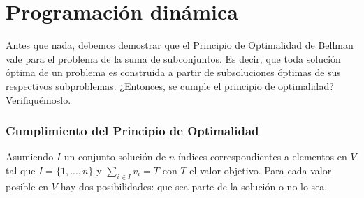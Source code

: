 \section{Programación dinámica}
Antes que nada, debemos demostrar que el Principio de Optimalidad de Bellman vale para el problema de la suma de subconjuntos. Es decir, que toda solución óptima de un problema es construida a partir de subsoluciones óptimas de sus respectivos subproblemas. ¿Entonces, se cumple el principio de optimalidad? Verifiquémoslo.

\subsubsection{Cumplimiento del Principio de Optimalidad}
Asumiendo $I$ un conjunto solución de $n$ índices correspondientes a elementos en $V$ tal que $I=\{1, ..., n\}$ y $\sum_{i \in I}v_{i} = T$ con $T$ el valor objetivo. Para cada valor posible en $V$ hay dos posibilidades: que sea parte de la solución o no lo sea.

